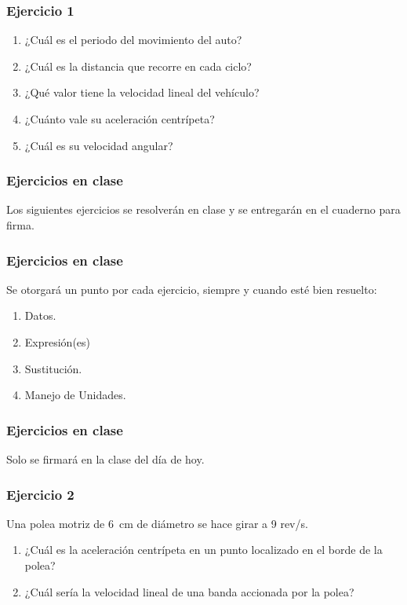 \documentclass[14pt]{beamer}
\begin{document}
\begin{frame}
\frametitle{Ejercicio 1}
\begin{enumerate}[<+->]
\item ¿Cuál es el periodo del movimiento del auto?
\item ¿Cuál es la distancia que recorre en cada ciclo?
\item ¿Qué valor tiene la velocidad lineal del vehículo?
\item ¿Cuánto vale su aceleración centrípeta?
\item ¿Cuál es su velocidad angular?
\end{enumerate}
\end{frame}
\begin{frame}
\frametitle{Ejercicios en clase}
Los siguientes ejercicios se resolverán en clase y se entregarán en el cuaderno para firma.
\end{frame}
\begin{frame}
\frametitle{Ejercicios en clase}
Se otorgará un punto por cada ejercicio, siempre y cuando esté bien resuelto:
\begin{enumerate}[<+->]
\item Datos.
\item Expresión(es)
\item Sustitución.
\item Manejo de Unidades.
\end{enumerate}
\end{frame}
\begin{frame}
\frametitle{Ejercicios en clase}
Solo se firmará en la clase del día de hoy.
\end{frame}
\begin{frame}
\frametitle{Ejercicio 2}
Una polea motriz de \SI{6}{\centi\meter} de diámetro se hace girar a 9 rev/s.
\begin{enumerate}[<+->]
\item ¿Cuál es la aceleración centrípeta en un punto localizado en el borde de la polea?
\item ¿Cuál sería la velocidad lineal de una banda accionada por la polea?
\end{enumerate}
\end{frame}
\end{document}
